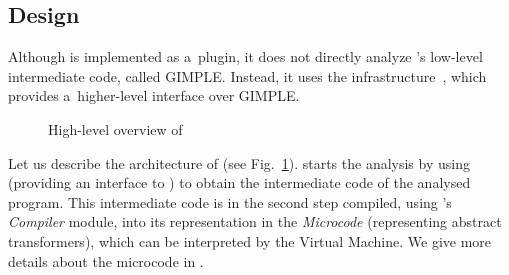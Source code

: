 {%

\subsection{Design}

Although \forester is implemented as a~\gcc plugin, it does not directly
analyze \gcc's low-level intermediate code, called GIMPLE.
Instead, it uses the \codelistener infrastructure~\cite{cl11},
which provides a~higher-level interface over GIMPLE.

\begin{figure}[t]
	\begin{center}
		
	\end{center}
	\caption{High-level overview of \forester}
	\label{fig:fa_exec}
\end{figure}


Let us describe the architecture of \forester (see Fig.~\ref{fig:fa_exec}).
\forester starts the analysis by using \codelistener (providing an interface to
\gcc) to obtain the intermediate code of the analysed program.
This intermediate code is in the second step compiled, using \forester's
\emph{Compiler} module, into its representation in the \forester
\emph{Microcode} (representing abstract transformers), which can be interpreted
by the Virtual Machine.
We give more details about the microcode in .

}
